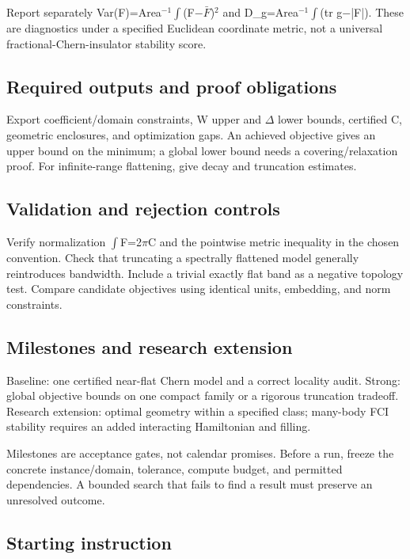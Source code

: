 \documentclass[
  11pt,
]{article}
\begin{document}
Report separately
Var(F)=Area\ensuremath{{}^{-1}}\ensuremath{\int}(F\ensuremath{-}\ensuremath{\bar{F}})\ensuremath{{}^{2}}
and D\_g=Area\ensuremath{{}^{-1}}\ensuremath{\int}(tr
g\ensuremath{-}|F|). These are diagnostics under a specified Euclidean
coordinate metric, not a universal fractional-Chern-insulator stability
score.

\subsection{Required outputs and proof obligations}

Export coefficient/domain constraints, W upper and \ensuremath{\Delta}
lower bounds, certified C, geometric enclosures, and optimization gaps.
An achieved objective gives an upper bound on the minimum; a global
lower bound needs a covering/relaxation proof. For infinite-range
flattening, give decay and truncation estimates.

\subsection{Validation and rejection controls}

Verify normalization \ensuremath{\int}F=2\ensuremath{\pi}C and the
pointwise metric inequality in the chosen convention. Check that
truncating a spectrally flattened model generally reintroduces
bandwidth. Include a trivial exactly flat band as a negative topology
test. Compare candidate objectives using identical units, embedding, and
norm constraints.

\subsection{Milestones and research extension}

Baseline: one certified near-flat Chern model and a correct locality
audit. Strong: global objective bounds on one compact family or a
rigorous truncation tradeoff. Research extension: optimal geometry
within a specified class; many-body FCI stability requires an added
interacting Hamiltonian and filling.

Milestones are acceptance gates, not calendar promises. Before a run,
freeze the concrete instance/domain, tolerance, compute budget, and
permitted dependencies. A bounded search that fails to find a result
must preserve an unresolved outcome.

\subsection{Starting instruction}
\end{document}
